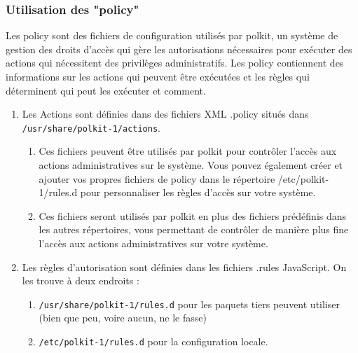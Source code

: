 \documentclass[12pt,a4paper]{article}
\newcommand{\code}[1]{\colorbox{light-gray}{\texttt{#1}}}
\begin{document}
\begin{flushleft}
\begin{flushleft}
                \subsubsection{Utilisation des "policy"}
                \begin{flushleft}
                    \noindent Les policy sont des fichiers de configuration utilisés par polkit, un système de gestion des droits d'accès qui gère les autorisations nécessaires pour exécuter des actions qui nécessitent des privilèges administratifs. Les policy contiennent des informations sur les actions qui peuvent être exécutées et les règles qui déterminent qui peut les exécuter et comment.
                    \begin{enumerate}
                        \item Les Actions sont définies dans des fichiers XML .policy situés dans \code{/usr/share/polkit-1/actions}. 
                        \begin{enumerate}
                            \item Ces fichiers peuvent être utilisés par polkit pour contrôler l'accès aux actions administratives sur le système. Vous pouvez également créer et ajouter vos propres fichiers de policy dans le répertoire /etc/polkit-1/rules.d pour personnaliser les règles d'accès sur votre système. 
                            \item Ces fichiers seront utilisés par polkit en plus des fichiers prédéfinis dans les autres répertoires, vous permettant de contrôler de manière plus fine l'accès aux actions administratives sur votre système.
                        \end{enumerate}
                        \item Les règles d'autorisation sont définies dans les fichiers .rules JavaScript. On les trouve à deux endroits : \cite{PartVMan11:online}
                        \begin{enumerate}
                            \item \code{/usr/share/polkit-1/rules.d} pour les paquets tiers peuvent utiliser (bien que peu, voire aucun, ne le fasse)
                            \item \code{/etc/polkit-1/rules.d} pour la configuration locale.
                        \end{enumerate}
                    \end{enumerate}
                \end{flushleft}

\end{flushleft}
\end{flushleft}
\end{document}
